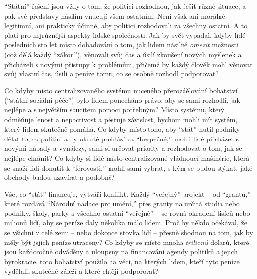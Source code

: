 \documentclass{book}
\begin{document}
\enquote{Státní} řešení jsou vždy o tom, že politici rozhodnou, jak řešit různé situace, a pak své představy násilím vnucují všem ostatním. Není však ani morálně legitimní, ani prakticky účinné, aby politici rozhodovali za všechny ostatní. A to platí pro nejrůznější aspekty lidské společnosti. Jak by svět vypadal, kdyby lidé posledních sto let místo dohadování o tom, jak lidem násilně \emph{omezit} možnosti (což dělá každý \enquote{zákon}), věnovali svůj čas a úsilí zkoušení nových myšlenek a přicházeli s novými přístupy k problémům, přičemž by každý člověk mohl věnovat svůj vlastní čas, úsilí a peníze tomu, co se osobně rozhodl podporovat?

Co kdyby místo centralizovaného systému nuceného přerozdělování bohatství (\enquote{státní sociální péče}) bylo lidem ponecháno právo, aby se sami rozhodli, jak nejlépe a s největším soucitem pomoci potřebným? Místo systému, který odměňuje lenost a nepoctivost a pěstuje závislost, bychom mohli mít systém, který lidem skutečně pomáhá. Co kdyby místo toho, aby \enquote{stát} nutil podniky dělat to, co politici a byrokraté prohlásí za \enquote{bezpečné,} mohli lidé přicházet s novými nápady a vynálezy, sami si určovat priority a rozhodovat o tom, jak se nejlépe chránit? Co kdyby si lidé místo centralizované vládnoucí mašinérie, která se snaží lidi donutit k \enquote{férovosti,} mohli sami vybrat, s kým se budou stýkat, jaké obchody budou uzavírat a podobně?

Vše, co \enquote{stát} financuje, vytváří konflikt. Každý \enquote{veřejný} projekt -- od \enquote{grantů,} které rozdává \enquote{Národní nadace pro umění,} přes granty na určitá studia nebo podniky, školy, parky a všechno ostatní \enquote{veřejné} -- se rovná okradení tisíců nebo milionů lidí, aby se peníze daly několika málo lidem. Proč by někdo očekával, že se všichni v celé zemi -- nebo dokonce stovka lidí -- přesně shodnou na tom, jak by měly být jejich peníze utraceny? Co kdyby se místo mnoha \emph{trilionů} dolarů, které jsou každoročně odváděny a uloupeny na financování agendy politiků a jejich byrokracie, toto bohatství použilo na věci, na kterých lidem, kteří tyto peníze vydělali, skutečně záleží a které chtějí podporovat?
\end{document}
